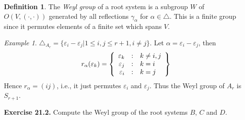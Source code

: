 \documentclass[10pt,twoside]{article}
\theoremstyle{definition}
\newtheorem{definition}[theorem]{Definition}
\theoremstyle{remark}
\newtheorem{example}[theorem]{Example}
\newcommand{\exercise}[1]{
	\vspace{9pt}\noindent
	{\bf Exercise #1.}
}
\begin{document}
\begin{definition}
The {\em Weyl group} of a root system is a subgroup $W$ of
$O(V,(\cdot,\cdot))$ generated by all reflections
$\gamma_{\alpha}$ for $\alpha\in\triangle$. This is a finite group
since it permutes elements of a finite set
which spans $V$.
\end{definition}

\begin{example}
$\triangle_{A_{r}}=\{\varepsilon_{i}-\varepsilon_{j}|1\leq i,j\leq
r+1, i\neq j\}$. Let $\alpha=\varepsilon_{i}-\varepsilon_{j}$,
then
$$
r_{\alpha}(\varepsilon_{k})=\left\{
\begin{array}{r@{\quad:\quad}l}
\varepsilon_{k} & k\neq i,j\\ 
\varepsilon_{j}& k=i \\
\varepsilon_{i} & k=j 
\end{array}
\right\}
$$
Hence $r_{\alpha}=(ij)$, i.e., it just permutes
$\varepsilon_{i}$ and $\varepsilon_{j}$. Thus the Weyl group of
$A_{r}$ is $S_{r+1}$.
\end{example}

\exercise{21.2} Compute the Weyl group of the root systems $B$, $C$ and $D$.
\end{document}
